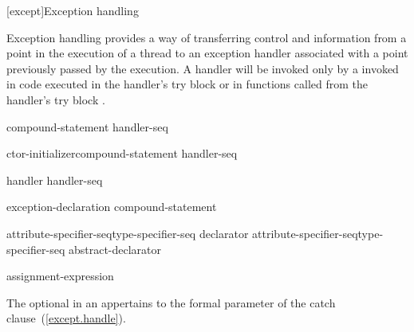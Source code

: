 [except]{Exception handling}%


%

\pnum
Exception handling provides a way of transferring control and information
from a point in the execution of a thread to an exception handler
associated with a point previously passed by the execution.
A handler will be invoked only by a
invoked in code executed in the handler's try block
or in functions called from the handler's try block .

%
%
\begin{bnf}
\br
     compound-statement handler-seq
\end{bnf}

%
%
\begin{bnf}
\br
     ctor-initializer\opt compound-statement handler-seq
\end{bnf}

\begin{bnf}
\br
    handler handler-seq\opt
\end{bnf}

%
%
\begin{bnf}
\br
     exception-declaration \terminal{)} compound-statement
\end{bnf}

\begin{bnf}
\br
    attribute-specifier-seq\opt type-specifier-seq declarator\br
    attribute-specifier-seq\opt type-specifier-seq abstract-declarator\opt\br
\end{bnf}

%
%
\begin{bnf}
\br
      assignment-expression\opt
\end{bnf}

The optional  in an 
appertains to the formal parameter of the catch clause~(\ref{except.handle}).

